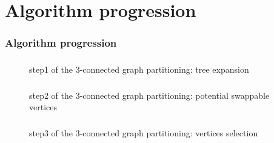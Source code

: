 \section{Algorithm progression}
\begin{frame}
	\frametitle{Algorithm progression}     
%                     

 \begin{figure}[H]
 \frametitle{}
	\begin{center}
	  
	\end{center}
	\caption{step1 of the 3-connected graph partitioning: tree expansion}
      \end{figure}
\end{frame}

\begin{frame}
 \begin{figure}[H]
 \frametitle{}
	\begin{center}
	  
	\end{center}
	\caption{step2 of the 3-connected graph partitioning: potential swappable vertices}
      \end{figure}
\end{frame}

\begin{frame}
 \begin{figure}[H]
 \frametitle{}
	\begin{center}
	  
	\end{center}
	\caption{step3 of the 3-connected graph partitioning: vertices selection}
      \end{figure}
\end{frame}

